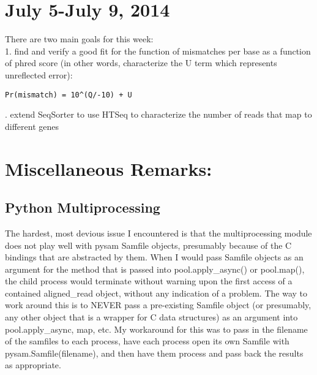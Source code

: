 \documentclass[11pt]{article}
\begin{document}
\section*{July 5-July 9, 2014}
There are two main goals for this week: \\
1. find and verify a good fit for the function of mismatches per base as a function of phred score (in other words, characterize the U term which represents unreflected error):
\begin{verbatim}
Pr(mismatch) = 10^(Q/-10) + U
\end{verbatim}
. extend SeqSorter to use HTSeq to characterize the number of reads that map to different genes
\\
\noindent

\section*{Miscellaneous Remarks:}
\subsection*{Python Multiprocessing}
The hardest, most devious issue I encountered is that the multiprocessing module does not play well with pysam Samfile objects, presumably because of the C bindings that are abstracted by them. When I would pass Samfile objects as an argument for the method that is passed into pool.apply\_async() or pool.map(), the child process would terminate without warning upon the first access of a contained aligned\_read object, without any indication of a problem. The way to work around this is to NEVER pass a pre-existing Samfile object (or presumably, any other object that is a wrapper for C data structures) as an argument into pool.apply\_async, map, etc. My workaround for this was to pass in the filename of the samfiles to each process, have each process open its own Samfile with pysam.Samfile(filename), and then have them process and pass back the results as appropriate.
\end{document}

